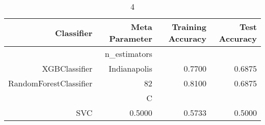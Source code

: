 
\begin{table}[H]
    \caption{4}
    \centering
    \begin{tabular}{|r|r|r|r|}
        \hline
        Classifier &Meta Parameter &Training Accuracy
        &Test Accuracy\\
        \hline
        &n\_estimators &\multicolumn{2}{|r|}{}\\
        \hline
        XGBClassifier &Indianapolis &0.7700 &0.6875\\
        \hline
        RandomForestClassifier &82 &0.8100 &0.6875\\
        \hline
        &C &\multicolumn{2}{|r|}{}\\
        \hline
        SVC &0.5000 &0.5733 &0.5000\\
        \hline
    \end{tabular}
\end{table}
